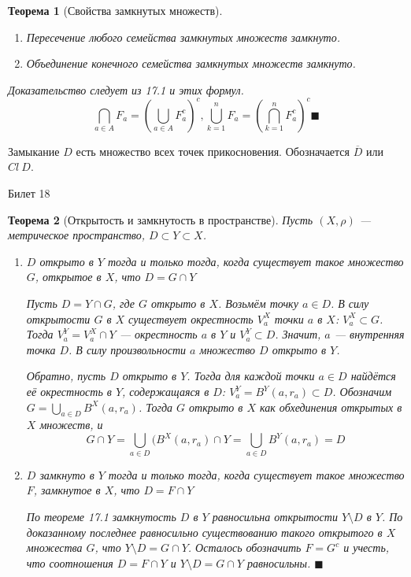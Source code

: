 \documentclass[12pt,a4paper]{article}
\newtheorem*{theorem*}{Теорема}
\begin{document}
\begin{theorem*}[Свойства замкнутых множеств]
\label{17.2}
\ 
\begin{enumerate}
\item Пересечение любого семейства замкнутых множеств замкнуто.
\item Объединение конечного семейства замкнутых множеств замкнуто.
\end{enumerate}

Доказательство следует из 17.1 и этих формул.
$$
\bigcap\limits_{a\in A}{F_a} = {\left( \bigcup\limits_{a\in A}{F_{a}^{c} }\right)}^{c}, \bigcup\limits_{k=1}^{n}{F_a} = {\left( \bigcap\limits_{k=1}^{n}{F_{a}^{c} }\right)}^{c} \blacksquare
$$
\end{theorem*}

Замыкание $D$ есть множество всех точек прикосновения. Обозначается $\overline{D}$ или $Cl\ D$.

\begin{center}
Билет 18
\end{center}

\begin{theorem*}[Открытость и замкнутость в пространстве]
\label{18.1}
Пусть $(X, \rho)$ --- метрическое пространство, $D \subset Y \subset X$.
\begin{enumerate}
\item $D$ открыто в $Y$ тогда и только тогда, когда существует такое множество $G$, открытое в $X$, что $D = G \cap Y$

Пусть $D=Y\cap G$, где $G$ открыто в $X$. Возьмём точку $a \in D$. В силу открытости $G$ в $X$ существует окрестность $V_{a}^{X}$ точки $a$ в $X$: $V_{a}^{X} \subset G$. Тогда $V_{a}^{Y}=V_{a}^{X} \cap Y$ --- окрестность $a$ в $Y$ и $V_a^{Y} \subset D$. Значит, $a$ --- внутренняя точка $D$. В силу произвольности $a$ множество $D$ открыто в $Y$.

Обратно, пусть $D$ открыто в $Y$. Тогда для каждой точки $a \in D$ найдётся её окрестность в $Y$, содержащаяся в $D$: $V_{a}^{Y} = B^{Y}(a, r_a) \subset D$. Обозначим $G = \bigcup\limits_{a\in D}{B^{X}(a, r_a)}$. Тогда $G$ открыто в $X$ как обхединения открытых в $X$ множеств, и
$$
G\cap Y = \bigcup\limits_{a\in D}{(B^{X}(a, r_a) \cap Y} = \bigcup\limits_{a \in D}{B^{Y}(a, r_a)} = D
$$

\item $D$ замкнуто в $Y$ тогда и только тогда, когда существует такое множество $F$, замкнутое в $X$, что $D = F \cap Y$

По теореме 17.1 замкнутость $D$ в $Y$ равносильна открытости $Y \setminus D$ в $Y$. По доказанному последнее равносильно существованию такого открытого в $X$ множества $G$, что $Y \setminus D = G \cap Y$. Осталось обозначить $F = G^{c}$ и учесть, что соотношения $D = F \cap Y$ и $Y \setminus D = G \cap Y$ равносильны. $\blacksquare$
\end{enumerate}
\end{theorem*}
\end{document}
